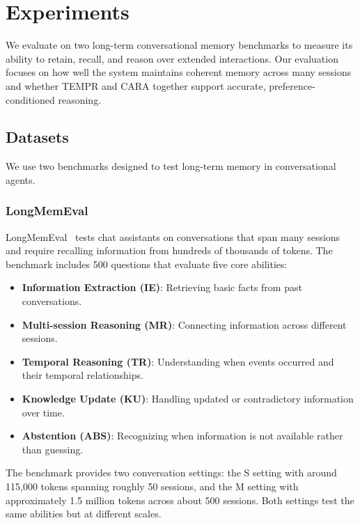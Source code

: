 \section{Experiments}
\label{sec:experiments}

We evaluate \our on two long-term conversational memory benchmarks to measure its ability to retain, recall, and reason over extended interactions. Our evaluation focuses on how well the system maintains coherent memory across many sessions and whether TEMPR and CARA together support accurate, preference-conditioned reasoning.

\subsection{Datasets}

We use two benchmarks designed to test long-term memory in conversational agents.

\subsubsection{LongMemEval}

LongMemEval~\cite{wu2024longmemeval} tests chat assistants on conversations that span many sessions and require recalling information from hundreds of thousands of tokens. The benchmark includes 500 questions that evaluate five core abilities:

\begin{itemize}
    \item \textbf{Information Extraction (IE)}: Retrieving basic facts from past conversations.
    \item \textbf{Multi-session Reasoning (MR)}: Connecting information across different sessions.
    \item \textbf{Temporal Reasoning (TR)}: Understanding when events occurred and their temporal relationships.
    \item \textbf{Knowledge Update (KU)}: Handling updated or contradictory information over time.
    \item \textbf{Abstention (ABS)}: Recognizing when information is not available rather than guessing.
\end{itemize}

The benchmark provides two conversation settings: the S setting with around 115,000 tokens spanning roughly 50 sessions, and the M setting with approximately 1.5 million tokens across about 500 sessions. Both settings test the same abilities but at different scales.

